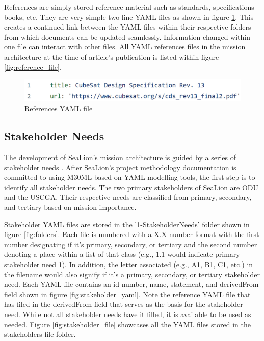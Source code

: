 \documentclass[journal,article,submit,pdftex,moreauthors]{Definitions/mdpi}
\begin{document}
References are simply stored reference material such as standards, specifications books, etc.  They are very simple two-line YAML files as shown in figure \ref{fig:reference_yaml}.  This creates a continued link between the YAML files within their respective folders from which documents can be updated seamlessly.  Information changed within one file can interact with other files.  All YAML references files in the mission architecture at the time of article's publication is listed within figure \ref{fig:reference_file}. 

\begin{figure}[H]
    \includegraphics[width=13.75 cm]{assets/reference.png}
    \caption{References YAML file}
	\label{fig:reference_yaml}
    \end{figure}   
\unskip

\subsection{Stakeholder Needs}
The development of SeaLion's mission architecture is guided by a series of stakeholder needs \cite{sealion_dof}.  After SeaLion's project methodology documentation is committed to using M30ML based on YAML modelling tools, the first step is to identify all stakeholder needs.  The two primary stakeholders of SeaLion are ODU and the USCGA.  Their respective needs are classified from primary, secondary, and tertiary based on mission importance.

Stakeholder YAML files are stored in the '1-StakeholderNeeds' folder shown in figure \ref{fig:folders}.  Each file is numbered with a X.X number format with the first number designating if it's primary, secondary, or tertiary and the second number denoting a place within a list of that class (e.g., 1.1 would indicate primary stakeholder need 1).  In addition, the letter associated (e.g., A1, B1, C1, etc.) in the filename would also signify if it's a primary, secondary, or tertiary stakeholder need.  Each YAML file contains an id number, name, statement, and derivedFrom field shown in figure \ref{fig:stakeholder_yaml}.  Note the reference YAML file that has filed in the derivedFrom field that serves as the basis for the stakeholder need.  While not all stakeholder needs have it filled, it is available to be used as needed.  Figure \ref{fig:stakeholder_file} showcases all the YAML files stored in the stakeholders file folder.
\end{document}
